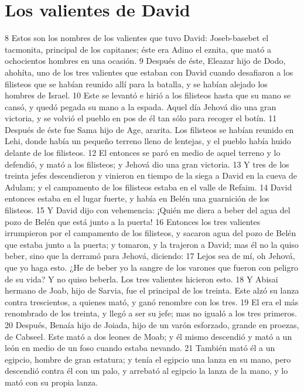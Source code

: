 \section*{Los valientes de David}

 
8 Estos son los nombres de los valientes que tuvo David: Joseb-basebet el tacmonita, principal de los capitanes; éste era Adino el eznita, que mató a ochocientos hombres en una ocasión.
9 Después de éste, Eleazar hijo de Dodo, ahohíta, uno de los tres valientes que estaban con David cuando desafiaron a los filisteos que se habían reunido allí para la batalla, y se habían alejado los hombres de Israel.
10 Este se levantó e hirió a los filisteos hasta que su mano se cansó, y quedó pegada su mano a la espada. Aquel día Jehová dio una gran victoria, y se volvió el pueblo en pos de él tan sólo para recoger el botín.
11 Después de éste fue Sama hijo de Age, ararita. Los filisteos se habían reunido en Lehi, donde había un pequeño terreno lleno de lentejas, y el pueblo había huido delante de los filisteos.
12 El entonces se paró en medio de aquel terreno y lo defendió, y mató a los filisteos; y Jehová dio una gran victoria.
13 Y tres de los treinta jefes descendieron y vinieron en tiempo de la siega a David en la cueva de Adulam; y el campamento de los filisteos estaba en el valle de Refaim.
14 David entonces estaba en el lugar fuerte, y había en Belén una guarnición de los filisteos.
15 Y David dijo con vehemencia: ¡Quién me diera a beber del agua del pozo de Belén que está junto a la puerta!
16 Entonces los tres valientes irrumpieron por el campamento de los filisteos, y sacaron agua del pozo de Belén que estaba junto a la puerta; y tomaron, y la trajeron a David; mas él no la quiso beber, sino que la derramó para Jehová, diciendo:
17 Lejos sea de mí, oh Jehová, que yo haga esto. ¿He de beber yo la sangre de los varones que fueron con peligro de su vida? Y no quiso beberla. Los tres valientes hicieron esto.
18 Y Abisai hermano de Joab, hijo de Sarvia, fue el principal de los treinta. Este alzó su lanza contra trescientos, a quienes mató, y ganó renombre con los tres.
19 El era el más renombrado de los treinta, y llegó a ser su jefe; mas no igualó a los tres primeros.
20 Después, Benaía hijo de Joiada, hijo de un varón esforzado, grande en proezas, de Cabseel. Este mató a dos leones de Moab; y él mismo descendió y mató a un león en medio de un foso cuando estaba nevando.
21 También mató él a un egipcio, hombre de gran estatura; y tenía el egipcio una lanza en su mano, pero descendió contra él con un palo, y arrebató al egipcio la lanza de la mano, y lo mató con su propia lanza.
